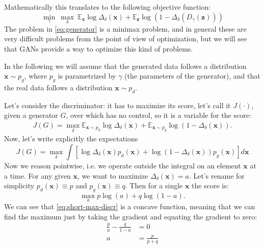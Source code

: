 Mathematically this translates to the following objective function:
\begin{equation}\label{eq:generator}
	\min_\gamma \ \max_\delta \ \mathbb{E}_{\mathbf{x}} \log \Delta_\delta(\mathbf{x}) + \mathbb{E}_{\mathbf{z}} \log \left( 1 - \Delta_\delta(D_\gamma(\mathbf{z})) \right)
\end{equation}
The problem in \cref{eq:generator} is a minimax problem, and in general these are very difficult problems from the point of view of optimization, but we will see that GANs provide a way to optimize this kind of problems.

In the following we will assume that the generated data follows a distribution $\mathbf{x} \sim p_g$, where $p_g$ is parametrized by $\gamma$ (the parameters of the generator), and that the real data follows a distribution $\mathbf{x} \sim p_d$.

Let's consider the discriminator: it has to maximize its score, let's call it $J(\cdot)$, given a generator $G$, over which has no control, so it is a variable for the score:
\begin{align}
    J(G) = \max_\delta \mathbb{E}_{\mathbf{x} \sim p_d} \log \Delta_\delta(\mathbf{x}) + \mathbb{E}_{\mathbf{x} \sim p_g} \log \left( 1 - \Delta_\delta(\mathbf{x}) \right).
    \label{eq:13:1:2:d-functional}
\end{align}
Now, let's write explicitly the expectations
\begin{equation}
    J(G) = \max_\delta \int \left[ \log \Delta_\delta(\mathbf{x})p_d(\mathbf{x}) + \log \left( 1 - \Delta_\delta(\mathbf{x})\right)p_g(\mathbf{x}) \right] d\mathbf{x} 
\end{equation}
Now we reason pointwise, i.e. we operate outside the integral on an element $\mathbf{x}$ at a time. For any given $\mathbf{x}$, we want to maximize $\Delta_\delta(\mathbf{x}) = a$. Let's rename for simplicity $p_d(\mathbf{x}) \equiv p$ and $p_g(\mathbf{x}) \equiv q$. Then for a single $\mathbf{x}$ the score is:
\begin{equation}\label{eq:short-max-discr}
	\max_a p \log(a) + q \log(1-a).
\end{equation}
We can see that \cref{eq:short-max-discr} is a concave function, meaning that we can find the maximum just by taking the gradient and equating the gradient to zero:
\begin{align}
	\frac{p}{a} - \frac{q}{1-a} &= 0 \\
	a &= \frac{p}{p + q}
\end{align}

